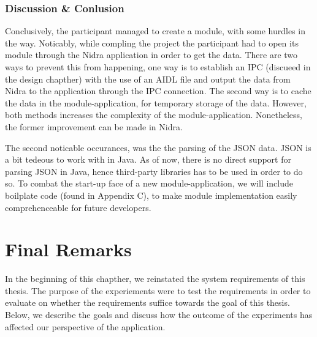 \subsubsection{Discussion \& Conlusion}

Conclusively, the participant managed to create a module, with some hurdles in the way. Noticably, while compling the project the participant had to open its module through the Nidra application in order to get the data. There are two ways to prevent this from happening, one way is to establish an IPC (discueed in the design chapther) with the use of an AIDL file and output the data from Nidra to the application through the IPC connection. The second way is to cache the data in the module-application, for temporary storage of the data. However, both methods increases the complexity of the module-application. Nonetheless, the former improvement can be made in Nidra.

The second noticable occurances, was the the parsing of the JSON data. JSON is a bit tedeous to work with in Java. As of now, there is no direct support for parsing JSON in Java, hence third-party libraries has to be used in order to do so. To combat the start-up face of a new module-application, we will include boilplate code (found in Appendix C), to make module implementation easily comprehenceable for future developers.


\section{Final Remarks}
In the beginning of this chapther, we reinstated the system requirements of this thesis. The purpose of the experiements were to test the requirements in order to evaluate on whether the requirements suffice towards the goal of this thesis. Below, we describe the goals and discuss how the outcome of the experiments has affected our perspective of the application.

